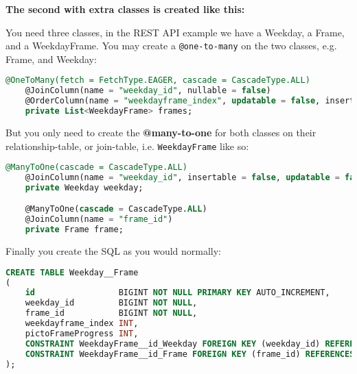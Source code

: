 \textbf{The second with extra classes is created like this:}

You need three classes, in the REST API example we have a Weekday, a Frame, and a WeekdayFrame.
You may create a \texttt{@one-to-many} on the two classes, e.g. Frame, and Weekday:

\begin{lstlisting}[caption={One of the relations on the opposite side to create the \texttt{One-to-Many} to the relationship class.}, language=sql]
    @OneToMany(fetch = FetchType.EAGER, cascade = CascadeType.ALL)
    @JoinColumn(name = "weekday_id", nullable = false)
    @OrderColumn(name = "weekdayframe_index", updatable = false, insertable = false)
    private List<WeekdayFrame> frames;
\end{lstlisting}


But you only need to create the \textbf{@many-to-one} for both classes on their relationship-table, or join-table, i.e. \texttt{WeekdayFrame} like so:

\begin{lstlisting}[caption={The two relations needed on the relationship class in order to create the \texttt{Many-to-Many} relationship.}, language=sql]
    @ManyToOne(cascade = CascadeType.ALL)
    @JoinColumn(name = "weekday_id", insertable = false, updatable = false)
    private Weekday weekday;

    @ManyToOne(cascade = CascadeType.ALL)
    @JoinColumn(name = "frame_id")
    private Frame frame;
\end{lstlisting}


Finally you create the SQL as you would normally:


\begin{lstlisting}[caption={The SQL needed for the relationship class to create the \texttt{Many-to-Many}.}, language=sql]
CREATE TABLE Weekday__Frame
(
    id                 BIGINT NOT NULL PRIMARY KEY AUTO_INCREMENT,
    weekday_id         BIGINT NOT NULL,
    frame_id           BIGINT NOT NULL,
    weekdayframe_index INT,
    pictoFrameProgress INT,
    CONSTRAINT WeekdayFrame__id_Weekday FOREIGN KEY (weekday_id) REFERENCES Weekday (id),
    CONSTRAINT WeekdayFrame__id_Frame FOREIGN KEY (frame_id) REFERENCES Frame (id)
);
\end{lstlisting}



